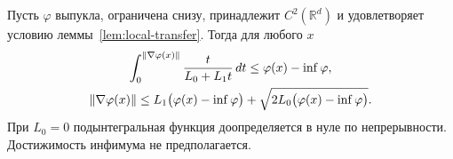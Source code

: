 \begin{lemma}\label{lem:self-bound}
Пусть $\varphi$ выпукла, ограничена снизу, принадлежит
$C^2(\mathbb R^d)$ и удовлетворяет условию леммы~\ref{lem:local-transfer}.
Тогда для любого $x$
\begin{equation}\label{eq:integral-self-bound}
 \begin{gathered}
 \int_0^{\lVert\nabla\varphi(x)\rVert}\frac{t}{L_0+L_1t}\,dt
 \le\varphi(x)-\inf\varphi,\\
 \lVert\nabla\varphi(x)\rVert
 \le L_1\bigl(\varphi(x)-\inf\varphi\bigr)
 +\sqrt{2L_0\bigl(\varphi(x)-\inf\varphi\bigr)}.
 \end{gathered}
\end{equation}
При $L_0=0$ подынтегральная функция доопределяется в нуле по непрерывности.
Достижимость инфимума не предполагается.
\end{lemma}


